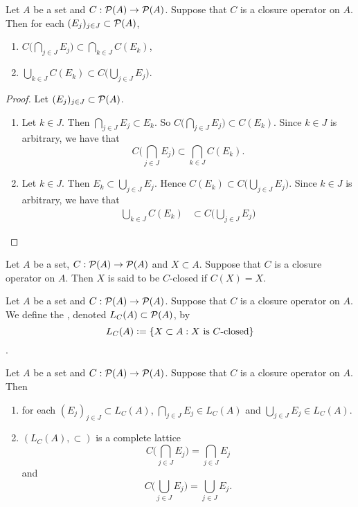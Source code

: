 \documentclass{book}
\begin{document}
	\begin{ex}
		Let $A$ be a set and $C: \mathcal{P}(A) \rightarrow \mathcal{P}(A)$. Suppose that $C$ is a closure operator on $A$. Then for each $(E_j)_{j \in J} \subset \mathcal{P}(A)$,
		\begin{enumerate}
			\item $C \bigg( \bigcap\limits_{j \in J} E_j \bigg) \subset \bigcap\limits_{k \in J} C(E_k)$,
			\item $\bigcup\limits_{k \in J} C(E_k) \subset C \bigg( \bigcup\limits_{j \in J} E_j \bigg)$.
		\end{enumerate}
	\end{ex}

	\begin{proof}
		Let $(E_j)_{j \in J} \subset \mathcal{P}(A)$. 
		\begin{enumerate}
			\item Let $k \in J$. Then $\bigcap\limits_{j \in J} E_j \subset E_k$.
			So $C \bigg( \bigcap\limits_{j \in J} E_j \bigg) \subset C(E_k)$. Since $k \in J$ is arbitrary, we have that 
			$$C \bigg( \bigcap\limits_{j \in J} E_j \bigg) \subset \bigcap\limits_{k \in J} C(E_k).$$ 
			\item Let $k \in J$. Then $E_k \subset \bigcup_{j \in J} E_j$. Hence $C(E_k) \subset C \bigg( \bigcup\limits_{j \in J} E_j \bigg)$. Since $k \in J$ is arbitrary, we have that 
			\begin{align*}
				\bigcup\limits_{k \in J} C(E_k) 
				& \subset C \bigg( \bigcup\limits_{j \in J} E_j \bigg)
			\end{align*}
			
		\end{enumerate}
	\end{proof}

	\begin{defn}
		Let $A$ be a set, $C: \mathcal{P}(A) \rightarrow \mathcal{P}(A)$ and $X \subset A$. Suppose that $C$ is a closure operator on $A$. Then $X$ is said to be $C$-closed if $C(X) = X$.  
	\end{defn}

	\begin{defn}
		Let $A$ be a set and $C: \mathcal{P}(A) \rightarrow \mathcal{P}(A)$. Suppose that $C$ is a closure operator on $A$. We define the , denoted $L_C(A) \subset \mathcal{P}(A)$, by 
		$$L_C(A) \vcentcolon= \{X \subset A: \text{$X$ is $C$-closed}\}$$. 
	\end{defn}


	\begin{ex}
		Let $A$ be a set and $C: \mathcal{P}(A) \rightarrow \mathcal{P}(A)$. Suppose that $C$ is a closure operator on $A$. Then
		\begin{enumerate}
			\item for each $(E_j)_{j \in J} \subset L_C(A)$, $\bigcap\limits_{j \in J} E_j \in L_C(A)$ and $\bigcup\limits_{j \in J} E_j \in L_C(A)$.
			\item $(L_C(A), \subset)$ is a complete lattice
			$$ C \bigg( \bigcap\limits_{j \in J} E_j \bigg) = \bigcap\limits_{j \in J} E_j $$ 
			and  
			$$ C \bigg(  \bigcup\limits_{j \in J} E_j \bigg) = \bigcup\limits_{j \in J} E_j.$$
		\end{enumerate}
	\end{ex}
\end{document}

